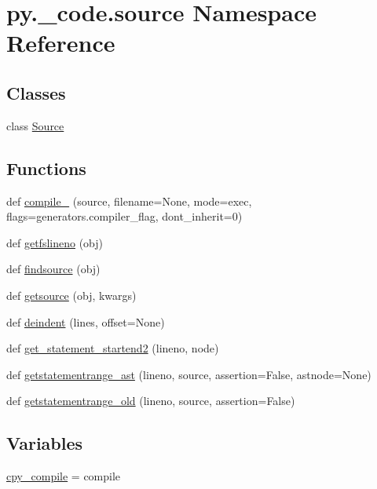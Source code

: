\hypertarget{namespacepy_1_1__code_1_1source}{}\section{py.\+\_\+code.\+source Namespace Reference}
\label{namespacepy_1_1__code_1_1source}
\subsection*{Classes}
\begin{DoxyCompactItemize}
\item 
class \hyperlink{classpy_1_1__code_1_1source_1_1_source}{Source}
\end{DoxyCompactItemize}
\subsection*{Functions}
\begin{DoxyCompactItemize}
\item 
def \hyperlink{namespacepy_1_1__code_1_1source_af3f5dcbd3ee701b6ecc866bd59a61f02}{compile\+\_\+} (source, filename=None, mode=\textquotesingle{}exec\textquotesingle{}, flags=generators.\+compiler\+\_\+flag, dont\+\_\+inherit=0)
\item 
def \hyperlink{namespacepy_1_1__code_1_1source_a0896e6c85119e84b6724fec4e7a1a750}{getfslineno} (obj)
\item 
def \hyperlink{namespacepy_1_1__code_1_1source_a2dd0b2333eacba0776e5e9508c346ee0}{findsource} (obj)
\item 
def \hyperlink{namespacepy_1_1__code_1_1source_a33bbc3ce5c7299f3b5be06578650e0be}{getsource} (obj, kwargs)
\item 
def \hyperlink{namespacepy_1_1__code_1_1source_ac2f9860641c07be3e9f445e0e79977ee}{deindent} (lines, offset=None)
\item 
def \hyperlink{namespacepy_1_1__code_1_1source_a980f74c1a6c12b6e34b6486a443b14c8}{get\+\_\+statement\+\_\+startend2} (lineno, node)
\item 
def \hyperlink{namespacepy_1_1__code_1_1source_afd23693d2233203cacb7f1a89f4526ba}{getstatementrange\+\_\+ast} (lineno, source, assertion=False, astnode=None)
\item 
def \hyperlink{namespacepy_1_1__code_1_1source_a53f7409a708ee74c1c91ccf1aabdf8b0}{getstatementrange\+\_\+old} (lineno, source, assertion=False)
\end{DoxyCompactItemize}
\subsection*{Variables}
\begin{DoxyCompactItemize}
\item 
\hyperlink{namespacepy_1_1__code_1_1source_a1cd74262fbc8a23faf3a58accebb63de}{cpy\+\_\+compile} = compile
\end{DoxyCompactItemize}



